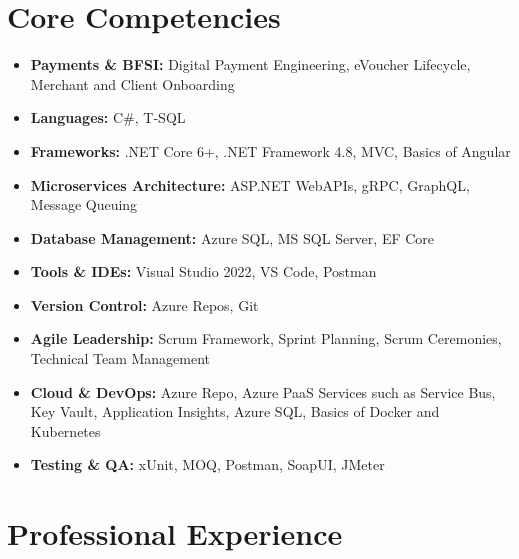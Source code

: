 \documentclass[12pt,a4paper]{article}
\begin{document}
\section*{Core Competencies}
\begin{itemize}
    \item \textbf{Payments \& BFSI:} Digital Payment Engineering, eVoucher Lifecycle, Merchant and Client Onboarding
    \item \textbf{Languages:} C\#, T-SQL
    \item \textbf{Frameworks:} .NET Core 6+, .NET Framework 4.8, MVC, Basics of Angular
    \item \textbf{Microservices Architecture:} ASP.NET WebAPIs, gRPC,  GraphQL, Message Queuing
    \item \textbf{Database Management:} Azure SQL, MS SQL Server, EF Core
    \item \textbf{Tools \& IDEs:} Visual Studio 2022, VS Code, Postman
    \item \textbf{Version Control:} Azure Repos, Git
    \item \textbf{Agile Leadership:} Scrum Framework, Sprint Planning, Scrum Ceremonies, Technical Team Management
    \item \textbf{Cloud \& DevOps:} Azure Repo, Azure PaaS Services such as Service Bus, Key Vault, Application Insights, Azure SQL,  Basics of Docker and Kubernetes
    \item \textbf{Testing \& QA:} xUnit, MOQ, Postman, SoapUI, JMeter
\end{itemize}

\section*{Professional Experience}
\end{document}
